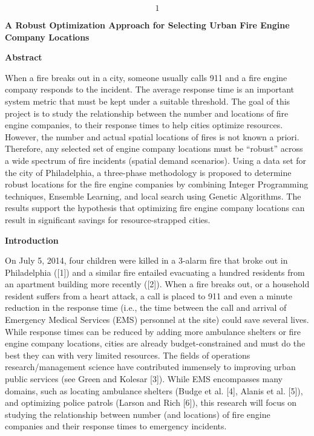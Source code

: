 \documentclass{article} %
\begin{document}


\noindent 

\noindent 

\noindent 

\noindent 
\[1\] 


\noindent \textbf{A Robust Optimization Approach for Selecting Urban Fire Engine Company Locations}

\noindent \textbf{}

\noindent \textbf{Abstract}

\noindent When a fire breaks out in a city, someone usually calls 911 and a fire engine company responds to the incident.  The average response time is an important system metric that must be kept under a suitable threshold. The goal of this project is to study the relationship between the number and locations of fire engine companies, to their response times to help cities optimize resources. However, the number and actual spatial locations of fires is not known a priori. Therefore, any selected set of engine company locations must be ``robust'' across a wide spectrum of fire incidents (spatial demand scenarios). Using a data set for the city of Philadelphia, a three-phase methodology is proposed to determine robust locations for the fire engine companies by combining Integer Programming techniques, Ensemble Learning, and local search using Genetic Algorithms. The results support the hypothesis that optimizing fire engine company locations can result in significant savings for resource-strapped cities.  

\noindent \textbf{Introduction}

\noindent On July 5, 2014, four children were killed in a 3-alarm fire that broke out in Philadelphia ([1]) and a similar fire entailed evacuating a hundred residents from an apartment building more recently ([2]).  When a fire breaks out, or a household resident suffers from a heart attack, a call is placed to 911 and even a minute reduction in the response time (i.e., the time between the call and arrival of Emergency Medical Services (EMS) personnel at the site) could save several lives.  While response times can be reduced by adding more ambulance shelters or fire engine company locations, cities are already budget-constrained and must do the best they can with very limited resources.  The fields of operations research/management science have contributed immensely to improving urban public services (see Green and Kolesar [3]).  While EMS encompasses many domains, such as locating ambulance shelters (Budge et al. [4], Alanis et al. [5]), and optimizing police patrols (Larson and Rich [6]), this research will focus on studying the relationship between number (and locations) of fire engine companies and their response times to emergency incidents.
\end{document}
